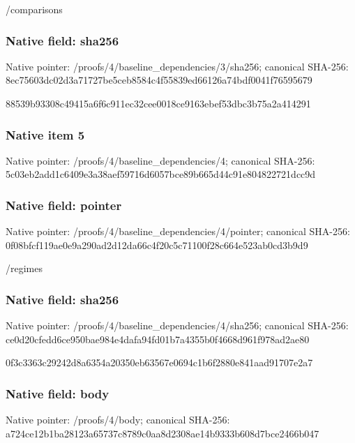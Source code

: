 \documentclass[10pt,a4paper]{article}
\begin{document}
\begingroup\raggedright\sloppy /\allowbreak{}comparisons\par\endgroup

\subsubsection{Native field: sha256}
Native pointer: /proofs/4/baseline\_\allowbreak{}dependencies/3/sha256; canonical SHA-256: 8ec75603dc02d3a71727be5ceb8584c4f55839ed66126a74bdf0041f76595679

\begingroup\raggedright\sloppy 88539b93308c49415a6f6c911ec32cee0018ce9163ebef53dbc3b75a2a414291\par\endgroup

\subsubsection{Native item 5}
Native pointer: /proofs/4/baseline\_\allowbreak{}dependencies/4; canonical SHA-256: 5c03eb2add1c6409e3a38aef59716d6057bce89b665d44c91e804822721dcc9d

\subsubsection{Native field: pointer}
Native pointer: /proofs/4/baseline\_\allowbreak{}dependencies/4/pointer; canonical SHA-256: 0f08bfcf119ae0e9a290ad2d12da66c4f20c5c71100f28c664e523ab0cd3b9d9

\begingroup\raggedright\sloppy /\allowbreak{}regimes\par\endgroup

\subsubsection{Native field: sha256}
Native pointer: /proofs/4/baseline\_\allowbreak{}dependencies/4/sha256; canonical SHA-256: ce0d20cfedd6ce950bae984e4dafa94fd01b7a4355b0f4668d961f978ad2ae80

\begingroup\raggedright\sloppy 0f3c3363c29242d8a6354a20350eb63567e0694c1b6f2880e841aad91707e2a7\par\endgroup

\subsubsection{Native field: body}
Native pointer: /proofs/4/body; canonical SHA-256: a724ce12b1ba28123a65737c8789c0aa8d2308ae14b9333b608d7bce2466b047
\end{document}
